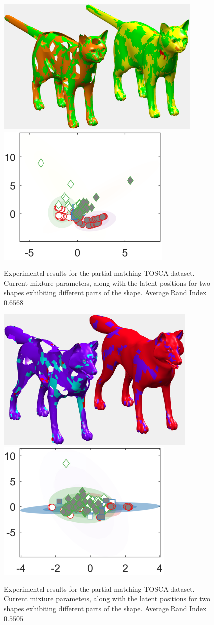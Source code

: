 \documentclass[]{article}
\begin{document}
\begin{figure}[ht!]
	\centering
	
	\includegraphics[width=0.5\linewidth]{img/holesCat1MVMMexp1}
	\includegraphics[width=0.35\linewidth]{img/holesCat1MVMMexp3}
	\caption{Experimental results for the partial matching TOSCA dataset.  Current mixture parameters, along with the latent positions for two shapes exhibiting different parts of the shape. Average Rand Index $0.6568$ }
\end{figure}
\begin{figure}[ht!]
	\centering
	
	\includegraphics[width=0.5\linewidth]{img/holesWolf1MVMMexp1}
	\includegraphics[width=0.35\linewidth]{img/holesWolf1MVMMexp3}
	\caption{Experimental results for the partial matching TOSCA dataset.  Current mixture parameters, along with the latent positions for two shapes exhibiting different parts of the shape. Average Rand Index $0.5505$ }
\end{figure}
\end{document}
